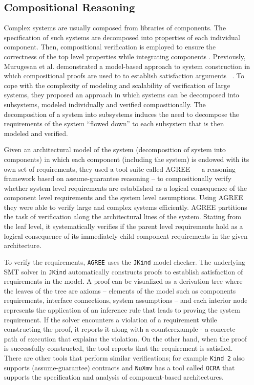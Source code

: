 \subsection{Compositional Reasoning}
Complex systems are usually composed from libraries of components. The specification of such systems are decomposed into properties of each individual component. Then, compositional verification is employed to ensure the correctness of the top level properties while integrating components \cite{NFM2012:CoGaMiWhLaLu}. Previously, Murugesan et al. demonstrated a model-based approach to system construction in which compositional proofs are used to to establish satisfaction arguments ~\cite{hilt2013}. To cope with the complexity of modeling and scalability of verification of large systems,
they proposed an approach in which systems can be decomposed into subsystems, modeled individually and verified compositionally. The decomposition of a system into subsystems induces the need to decompose the requirements of the system ``flowed down'' to each subsystem that is then modeled and verified.

Given an architectural model of the system (decomposition of system into components) in which each component (including the system) is endowed with its own set of requirements,
 they used a tool suite called AGREE~\cite{NFM2012:CoGaMiWhLaLu} -- a reasoning framework based on assume-guarantee reasoning -- to compositionally verify whether system level requirements are established as a logical consequence of the component level requirements and the system level assumptions.
 Using AGREE they were able to verify large and complex systems efficiently. AGREE partitions the task of verification along the architectural lines of the system. Stating from the leaf level, it systematically verifies if the parent level requirements hold as a logical consequence of its immediately child component requirements in the given architecture.

To verify the requirements, \texttt{AGREE} uses the \texttt{JKind} \cite{jkind} model checker. The underlying SMT solver in  \texttt{JKind} automatically constructs proofs to establish satisfaction of requirements in the model. A proof can be visualized as a derivation tree where the leaves of the tree are axioms -- elements of the model such as components requirements, interface connections, system assumptions -- and each interior node represents the application of an inference rule that leads to proving the system requirement. If the solver encounters a violation of a requirement while constructing the proof, it reports it along with a counterexample - a concrete path of execution that explains the violation. On the other hand, when the proof is successfully constructed, the tool reports that the requirement is satisfied.
There are other tools that perform similar verifications; for example \texttt{Kind 2} \cite{champion2016cav} also supports (assume-guarantee) contracts and \texttt{NuXmv} has a tool called \texttt{OCRA} \cite{ocra} that supports the specification and analysis of component-based architectures.

